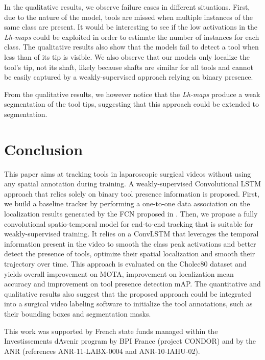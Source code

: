\documentclass{svjour3}                     \smartqed
\begin{document}
In the qualitative results, we observe failure cases in different situations. First, due to the nature of the model, tools are missed when multiple instances of the same class are present. It would be interesting to see if the low activations in the \emph{Lh-maps} could be exploited in order to estimate the number of instances for each class.
The qualitative results also show that the models fail to detect a tool when less than  of its tip is visible. 
We also observe that our models only localize the tool's tip, not its shaft, likely because shafts are similar for all tools and cannot be easily captured by a weakly-supervised approach relying on binary presence.

From the qualitative results, we however notice that the \emph{Lh-maps} produce a weak segmentation of the tool tips, suggesting that this approach could be extended to segmentation.



\section{Conclusion}\label{sec:conclusion}
This paper aims at tracking tools in laparoscopic surgical videos without using any spatial annotation during training. 
A weakly-supervised Convolutional LSTM approach that relies solely on binary tool presence information is proposed. 
First, we build a baseline tracker by performing a one-to-one data association on the localization results generated by the FCN proposed in \cite{miccai:vardazaryan2018weakly}.
Then, we propose a fully convolutional spatio-temporal model for end-to-end tracking that is suitable for weakly-supervised training. It relies on a ConvLSTM that leverages the temporal information present in the video to smooth the class peak activations and better detect the presence of tools, optimize their spatial localization and smooth their trajectory over time. 
This approach is evaluated on the Cholec80 dataset and yields  overall improvement on MOTA,  improvement on localization mean accuracy and  improvement on tool presence detection mAP.
The quantitative and qualitative results also suggest that the proposed approach could be integrated into a surgical video labeling software to initialize the tool annotations, such as their bounding boxes and segmentation masks.



\begin{acknowledgements}
This work was supported by French state funds managed
within the Investissements d\textsc{}Avenir program by BPI France (project CONDOR) and by the ANR (references ANR-11-LABX-0004 and ANR-10-IAHU-02). 
\end{acknowledgements}
\end{document}

